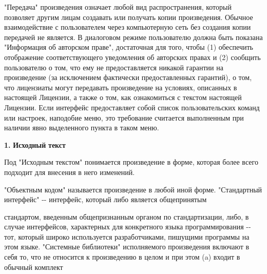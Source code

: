 "{}Передача"{} произведения означает любой вид распространения, который позволяет другим лицам создавать или получать копии произведения. Обычное взаимодействие с пользователем через компьютерную сеть без создания копии передачей не является. В диалоговом режиме пользователю должна быть показана "{}Информация об авторском праве"{}, достаточная для того, чтобы (1) обеспечить отображение соответствующего уведомления об авторских правах и (2) сообщить пользователю о том, что ему не предоставляется никакой гарантии на произведение (за исключением фактически предоставленных гарантий), о том, что лицензиаты могут передавать произведение на условиях, описанных в настоящей Лицензии, а также о том, как ознакомиться с текстом настоящей Лицензии. Если интерфейс предоставляет собой список пользовательских команд или настроек, наподобие меню, это требование считается выполненным при наличии явно выделенного пункта в таком меню.

{\bfseries{1.}} {\bfseries{Исходный}} {\bfseries{текст}}

Под "{}Исходным текстом"{} понимается произведение в форме, которая более всего подходит для внесения в него изменений.

"{}Объектным кодом"{} называется произведение в любой иной форме. "{}Стандартный интерфейс"{} -\/-\/ интерфейс, который либо является общепринятым

стандартом, введенным общепризнанным органом по стандартизации, либо, в случае интерфейсов, характерных для конкретного языка программирования -\/-\/ тот, который широко используется разработчиками, пишущими программы на этом языке. "{}Системные библиотеки"{} исполняемого произведения включают в себя то, что не относится к произведению в целом и при этом (a) входит в обычный комплект

